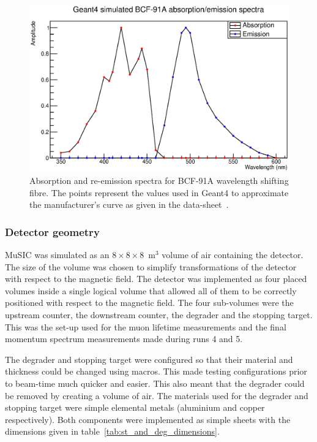 \begin{figure}[hptb]
  \centering
    \includegraphics[width=.9\textwidth]{images/bcf-91a-g4.eps}
  \caption{Absorption and re-emission spectra for BCF-91A wavelength shifting fibre. The points represent the values used in Geant4 to approximate the manufacturer's curve as given in the data-sheet~\cite{bcf_91a}.}
  \label{fig:images_bcf-91a-g4}
\end{figure}

\subsubsection{Detector geometry} %
\label{ssub:implementation_detector_geometry}

MuSIC was simulated as an \(8\times8\times8\)~m\(^3\) volume of air containing the detector. The size of the volume was chosen to simplify transformations of the detector with respect to the magnetic field. The detector was implemented as four placed volumes inside a single logical volume that allowed all of them to be correctly positioned with respect to the magnetic field. The four sub-volumes were the upstream counter, the downstream counter, the degrader and the stopping target. This was the set-up used for the muon lifetime measurements and the final momentum spectrum measurements made during runs 4 and 5.

The degrader and stopping target were configured so that their material and thickness could be changed using macros. This made testing configurations prior to beam-time much quicker and easier. This also meant that the degrader could be removed by creating a volume of air. The materials used for the degrader and stopping target were simple elemental metals (aluminium and copper respectively). Both components were implemented as simple sheets with the dimensions given in table~\ref{tab:st_and_deg_dimensions}.

